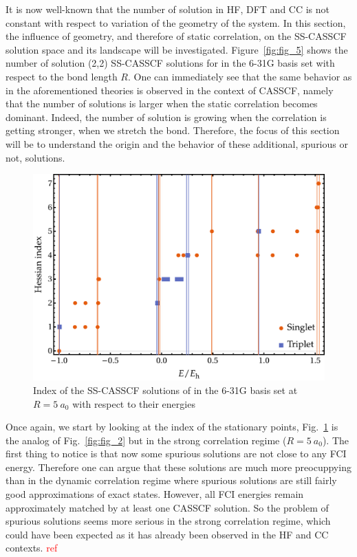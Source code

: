 \documentclass[aip,jcp,reprint,noshowkeys,superscriptaddress]{revtex4-1}
\newcommand{\todo}[1]{\textcolor{red}{#1}}
\begin{document}
It is now well-known that the number of solution in HF, DFT and CC is not constant with respect to variation of the geometry of the system. \cite{Burton_2021}
In this section, the influence of geometry, and therefore of static correlation, on the SS-CASSCF solution space and its landscape will be investigated.
Figure~\ref{fig:fig_5} shows the number of solution (2,2) SS-CASSCF solutions for  in the 6-31G basis set with respect to the bond length $R$.
One can immediately see that the same behavior as in the aforementioned theories is observed in the context of CASSCF, namely that the number of solutions is larger when the static correlation becomes dominant.
Indeed, the number of solution is growing when the correlation is getting stronger, \ie when we stretch the bond.
Therefore, the focus of this section will be to understand the origin and the behavior of these additional, spurious or not, solutions.

\begin{figure}
  \includegraphics[width=0.9\linewidth]{Figures/fig_3b.pdf}
  \caption{Index of the SS-CASSCF solutions of  in the 6-31G basis set at $R=5~a_0$ with respect to their energies
    \label{fig:fig_6}}
\end{figure}

Once again, we start by looking at the index of the stationary points, Fig.~\ref{fig:fig_6} is the analog of Fig.~\ref{fig:fig_2} but in the strong correlation regime ($R=5~a_0$).
The first thing to notice is that now some spurious solutions are not close to any FCI energy.
Therefore one can argue that these solutions are much more preocuppying than in the dynamic correlation regime where spurious solutions are still fairly good approximations of exact states.
However, all FCI energies remain approximately matched by at least one CASSCF solution.
So the problem of spurious solutions seems more serious in the strong correlation regime, which could have been expected as it has already been observed in the HF and CC contexts. \todo{ref}
\end{document}
